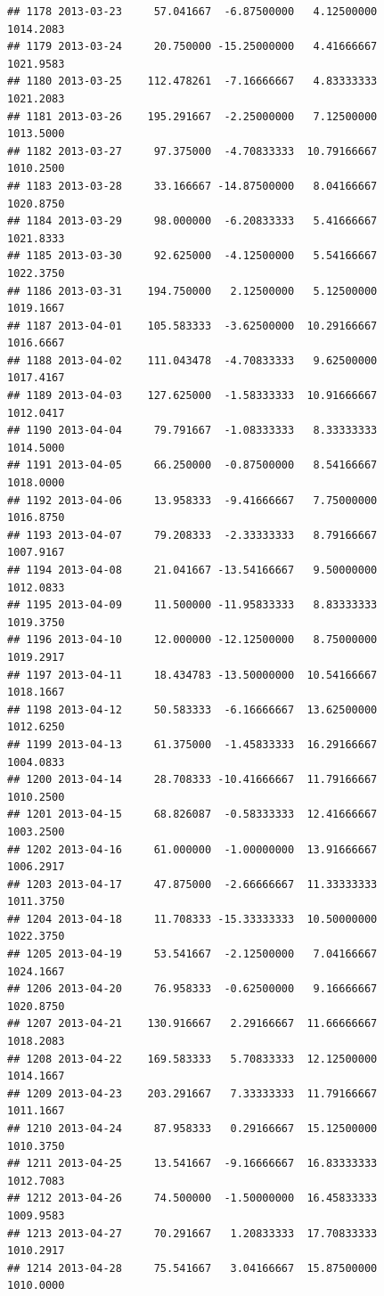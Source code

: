 \documentclass[
]{article}
\begin{document}
\begin{verbatim}
## 1178 2013-03-23     57.041667  -6.87500000   4.12500000    1014.2083
## 1179 2013-03-24     20.750000 -15.25000000   4.41666667    1021.9583
## 1180 2013-03-25    112.478261  -7.16666667   4.83333333    1021.2083
## 1181 2013-03-26    195.291667  -2.25000000   7.12500000    1013.5000
## 1182 2013-03-27     97.375000  -4.70833333  10.79166667    1010.2500
## 1183 2013-03-28     33.166667 -14.87500000   8.04166667    1020.8750
## 1184 2013-03-29     98.000000  -6.20833333   5.41666667    1021.8333
## 1185 2013-03-30     92.625000  -4.12500000   5.54166667    1022.3750
## 1186 2013-03-31    194.750000   2.12500000   5.12500000    1019.1667
## 1187 2013-04-01    105.583333  -3.62500000  10.29166667    1016.6667
## 1188 2013-04-02    111.043478  -4.70833333   9.62500000    1017.4167
## 1189 2013-04-03    127.625000  -1.58333333  10.91666667    1012.0417
## 1190 2013-04-04     79.791667  -1.08333333   8.33333333    1014.5000
## 1191 2013-04-05     66.250000  -0.87500000   8.54166667    1018.0000
## 1192 2013-04-06     13.958333  -9.41666667   7.75000000    1016.8750
## 1193 2013-04-07     79.208333  -2.33333333   8.79166667    1007.9167
## 1194 2013-04-08     21.041667 -13.54166667   9.50000000    1012.0833
## 1195 2013-04-09     11.500000 -11.95833333   8.83333333    1019.3750
## 1196 2013-04-10     12.000000 -12.12500000   8.75000000    1019.2917
## 1197 2013-04-11     18.434783 -13.50000000  10.54166667    1018.1667
## 1198 2013-04-12     50.583333  -6.16666667  13.62500000    1012.6250
## 1199 2013-04-13     61.375000  -1.45833333  16.29166667    1004.0833
## 1200 2013-04-14     28.708333 -10.41666667  11.79166667    1010.2500
## 1201 2013-04-15     68.826087  -0.58333333  12.41666667    1003.2500
## 1202 2013-04-16     61.000000  -1.00000000  13.91666667    1006.2917
## 1203 2013-04-17     47.875000  -2.66666667  11.33333333    1011.3750
## 1204 2013-04-18     11.708333 -15.33333333  10.50000000    1022.3750
## 1205 2013-04-19     53.541667  -2.12500000   7.04166667    1024.1667
## 1206 2013-04-20     76.958333  -0.62500000   9.16666667    1020.8750
## 1207 2013-04-21    130.916667   2.29166667  11.66666667    1018.2083
## 1208 2013-04-22    169.583333   5.70833333  12.12500000    1014.1667
## 1209 2013-04-23    203.291667   7.33333333  11.79166667    1011.1667
## 1210 2013-04-24     87.958333   0.29166667  15.12500000    1010.3750
## 1211 2013-04-25     13.541667  -9.16666667  16.83333333    1012.7083
## 1212 2013-04-26     74.500000  -1.50000000  16.45833333    1009.9583
## 1213 2013-04-27     70.291667   1.20833333  17.70833333    1010.2917
## 1214 2013-04-28     75.541667   3.04166667  15.87500000    1010.0000

\end{verbatim}
\end{document}
